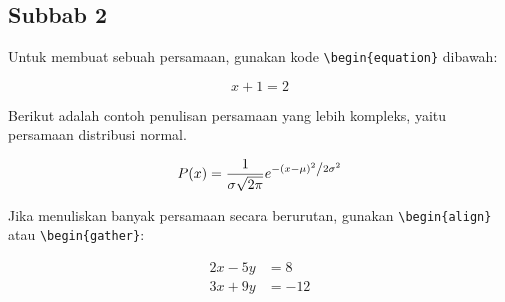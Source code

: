 \subsection{Subbab 2} \label{II.Subbab2}
Untuk membuat sebuah persamaan, gunakan kode \verb|\begin{equation}| dibawah: \par

\begin{equation}
	x + 1 = 2
\end{equation}
\label{eq:2.sum}

Berikut adalah contoh penulisan persamaan yang lebih kompleks, yaitu persamaan distribusi normal. \par

\begin{equation}
	P(x) = \frac{1}{{\sigma \sqrt {2\pi } }}e^{{{ - \left( {x - \mu } \right)^2 } \mathord{\left/ {\vphantom {{ - \left( {x - \mu } \right)^2 } {2\sigma ^2 }}} \right. \kern-\nulldelimiterspace} {2\sigma ^2 }}}
\end{equation}
\label{eq:2.normal}

Jika menuliskan banyak persamaan secara berurutan, gunakan  \verb|\begin{align}| atau \verb|\begin{gather}|: \par

\begin{align} 
	2x - 5y &=  8 \\ 
	3x + 9y &=  -12
\end{align}
\label{eq:2.SPL}
